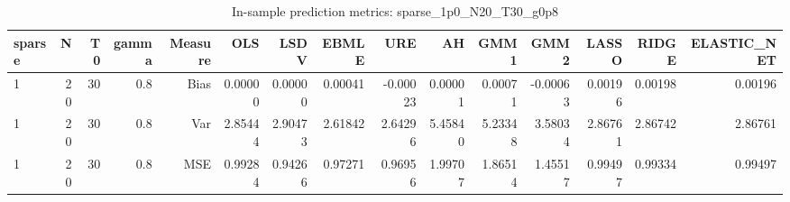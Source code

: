 \begin{table}[!htbp]\centering
\caption{In-sample prediction metrics: sparse_1p0_N20_T30_g0p8}
\label{tab:table2_sparse_1p0_N20_T30_g0p8}
\begin{tabular}{lrrrrrrrrrrrrrr}
\hline
sparse & N & T0 & gamma & Measure & OLS & LSDV & EBMLE & URE & AH & GMM1 & GMM2 & LASSO & RIDGE & ELASTIC_NET \\
\hline
1 & 20 & 30 & 0.8 & Bias & 0.00000 & 0.00000 & 0.00041 & -0.00023 & 0.00001 & 0.00071 & -0.00063 & 0.00196 & 0.00198 & 0.00196 \\
1 & 20 & 30 & 0.8 & Var & 2.85444 & 2.90473 & 2.61842 & 2.64296 & 5.45840 & 5.23348 & 3.58034 & 2.86761 & 2.86742 & 2.86761 \\
1 & 20 & 30 & 0.8 & MSE & 0.99284 & 0.94266 & 0.97271 & 0.96956 & 1.99707 & 1.86514 & 1.45517 & 0.99497 & 0.99334 & 0.99497 \\
\hline
\end{tabular}
\end{table}

